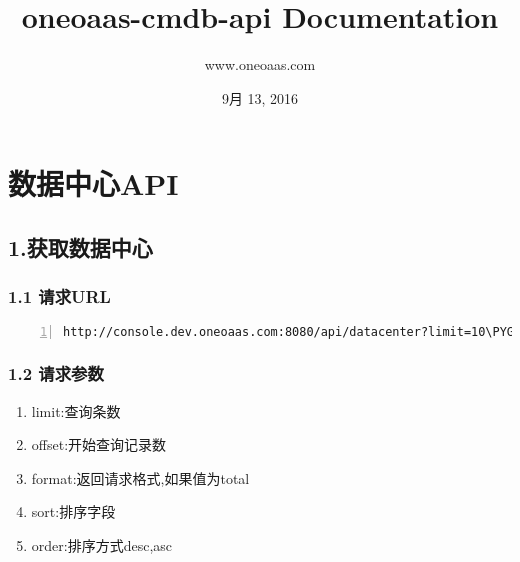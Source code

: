 \documentclass[letterpaper,10pt,english]{sphinxmanual}
\title{oneoaas-cmdb-api Documentation}
\date{9月 13, 2016}
\author{www.oneoaas.com}
\def\PYGZam{\char`\&}
\begin{document}
\maketitle
\tableofcontents
{}\label{index::doc}



\chapter{数据中心API}
\label{datacenter:api}\label{datacenter::doc}\label{datacenter:id1}

\section{1.获取数据中心}
\label{datacenter:id1}

\subsection{1.1 请求URL}
\label{datacenter:url}
\begin{Verbatim}[commandchars=\\\{\},numbers=left,firstnumber=1,stepnumber=1]
http://console.dev.oneoaas.com:8080/api/datacenter?limit=10\PYGZam{}offset=0\PYGZam{}format=total\PYGZam{}sort=Dcid\PYGZam{}order=asc
\end{Verbatim}


\subsection{1.2 请求参数}
\label{datacenter:id2}\begin{enumerate}
\item {} 
limit:查询条数

\item {} 
offset:开始查询记录数

\item {} 
format:返回请求格式,如果值为total

\item {} 
sort:排序字段

\item {} 
order:排序方式desc,asc

\end{enumerate}
\end{document}

